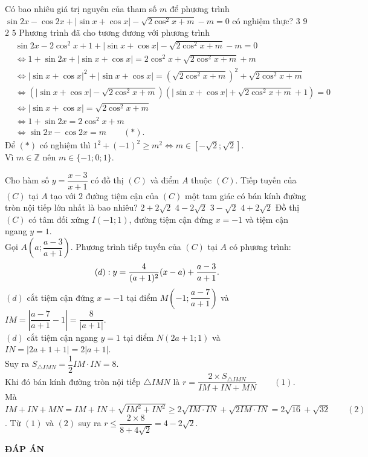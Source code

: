 \begin{ex}%
	Có bao nhiêu giá trị nguyên của tham số $m$ để phương trình $\sin 2x -\cos 2x+|\sin x+\cos x|-\sqrt{2\cos^2 x+m}-m=0$ có nghiệm thực?
	\choice
	{\True $3$}
	{$9$}
	{$2$}
	{$5$}
	\loigiai
	{
		Phương trình đã cho tương đương với phương trình
		$$\begin{aligned}
			&\sin 2x -2\cos^2x+1+|\sin x+\cos x|-\sqrt{2\cos^2 x+m}-m=0\\
			&\Leftrightarrow 1+\sin 2x +|\sin x+\cos x|=2\cos^2x+\sqrt{2\cos^2 x+m}+m\\
			&\Leftrightarrow |\sin x+\cos x|^2+|\sin x+\cos x|=\left(\sqrt{2\cos^2 x+m}\right)^2+\sqrt{2\cos^2 x+m}\\
			&\Leftrightarrow \left(|\sin x+\cos x|-\sqrt{2\cos^2 x+m}\right)\left(|\sin x+\cos x|+\sqrt{2\cos^2 x+m}+1\right)=0\\
			&\Leftrightarrow |\sin x+\cos x|=\sqrt{2\cos^2 x+m}\\
			&\Leftrightarrow 1+\sin 2x =2\cos^2 x+m\\
			&\Leftrightarrow \sin 2x -\cos 2x=m\qquad(*).
		\end{aligned}$$
		Để $(*)$ có nghiệm thì $1^2+(-1)^2\ge m^2 \Leftrightarrow m \in \left[-\sqrt{2};\sqrt{2}\right]$.\\
		Vì $m \in \mathbb{Z}$ nên $m \in \{-1;0;1\}$.
	}
\end{ex}

\begin{ex}%
	Cho hàm số $y=\dfrac{x-3}{x+1}$ có đồ thị $(C)$ và điểm $A$ thuộc $(C)$. Tiếp tuyến của $(C)$ tại $A$ tạo với $2$ đường tiệm cận của $(C)$ một tam giác có bán kính đường tròn nội tiếp lớn nhất là bao nhiêu?
	\choice
	{$2+2\sqrt{2}$}
	{\True $4-2\sqrt{2}$}
	{$3-\sqrt{2}$}
	{$4+2\sqrt{2}$}
	\loigiai
	{
		Đồ thị $(C)$ có tâm đối xứng $I(-1;1)$, đường tiệm cận đứng $x=-1$ và tiệm cận ngang $y=1$.\\
		Gọi $A\left(a;\dfrac{a-3}{a+1}\right)$. Phương trình tiếp tuyến của $(C)$ tại $A$ có phương trình:
		\vspace{-2ex}$$
			(d):y=\dfrac{4}{(a+1)^2}(x-a)+\dfrac{a-3}{a+1}.
		\vspace{-2ex}$$
	$(d)$ cắt tiệm cận đứng $x=-1 $ tại điểm $M(-1;\dfrac{a-7}{a+1})$ và $IM=\left|\dfrac{a-7}{a+1}-1\right|=\dfrac{8}{|a+1|}$.\\	
	$(d)$ cắt tiệm cận ngang $y=1 $ tại điểm $N(2a+1;1)$ và $IN=\left|2a+1+1\right|=2|a+1|$.\\
	Suy ra $S_{\triangle IMN}=\dfrac{1}{2}IM\cdot IN=8.$\\
	Khi đó bán kính đường tròn nội tiếp $\triangle IMN$ là $r=\dfrac{2\times S_{\triangle IMN}}{IM+IN+MN}\qquad(1)$.\\
    Mà $IM+IN+MN=IM+IN+\sqrt{IM^2+IN^2}\ge2\sqrt{IM\cdot IN}+\sqrt{2IM\cdot IN}=2\sqrt{16}+\sqrt{32}\qquad(2)$.
    Từ $(1)$ và $(2)$ suy ra $r\le\dfrac{2\times8}{8+4\sqrt{2}}=4-2\sqrt{2}$.
	}
\end{ex}

\newpage
\begin{center}
	\textbf{ĐÁP ÁN}
\end{center}
\begin{multicols}{10}
	 
\end{multicols}
